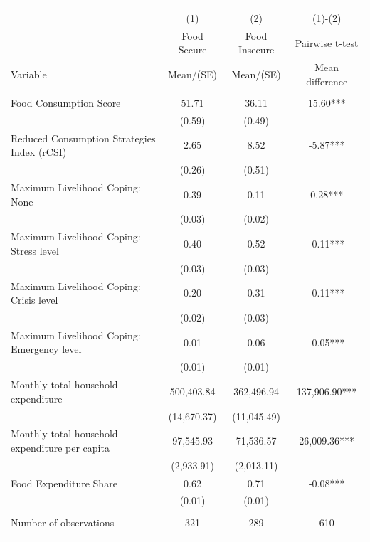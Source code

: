 
\begin{tabular}{@{\extracolsep{5pt}}lccc}
\\[-1.8ex]\hline \hline \\[-1.8ex]
 & \multicolumn{1}{c}{(1)}  & \multicolumn{1}{c}{(2)}  & \multicolumn{1}{c}{(1)-(2)} \\
 & \multicolumn{1}{c}{Food Secure}  & \multicolumn{1}{c}{Food Insecure}  & \multicolumn{1}{c}{Pairwise t-test}  \\
Variable & Mean/(SE) & Mean/(SE) & Mean difference \\ \hline \\[-1.8ex] 
Food Consumption Score   & 51.71    & 36.11    & 15.60***   \\
 & (0.59)  & (0.49)  &  \\ [1ex]
Reduced Consumption Strategies Index (rCSI)   & 2.65    & 8.52    & -5.87***   \\
 & (0.26)  & (0.51)  &  \\ [1ex]
Maximum Livelihood Coping: None   & 0.39    & 0.11    & 0.28***   \\
 & (0.03)  & (0.02)  &  \\ [1ex]
Maximum Livelihood Coping: Stress level   & 0.40    & 0.52    & -0.11***   \\
 & (0.03)  & (0.03)  &  \\ [1ex]
Maximum Livelihood Coping: Crisis level   & 0.20    & 0.31    & -0.11***   \\
 & (0.02)  & (0.03)  &  \\ [1ex]
Maximum Livelihood Coping: Emergency level   & 0.01    & 0.06    & -0.05***   \\
 & (0.01)  & (0.01)  &  \\ [1ex]
Monthly total household expenditure   & 500,403.84    & 362,496.94    & 137,906.90***   \\
 & (14,670.37)  & (11,045.49)  &  \\ [1ex]
Monthly total household expenditure per capita   & 97,545.93    & 71,536.57    & 26,009.36***   \\
 & (2,933.91)  & (2,013.11)  &  \\ [1ex]
Food Expenditure Share   & 0.62    & 0.71    & -0.08***   \\
 & (0.01)  & (0.01)  &  \\ [1ex]
\hline \\[-1.8ex]
Number of observations  & 321   & 289  & 610  \\
\hline \hline \\[-1.8ex]

\end{tabular}
